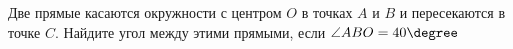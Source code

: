 \begin{ex}
	\begin{condition}
		Две прямые касаются окружности с центром \( O \) в точках \( A \) и \( B \) и пересекаются в точке \( C \). Найдите угол между этими прямыми, если \( \angle ABO = 40\degree \)
	\end{condition}
\end{ex}